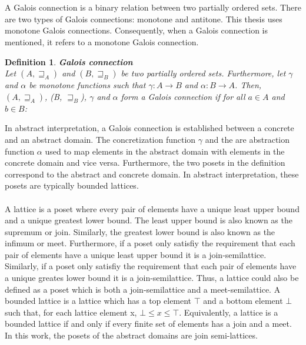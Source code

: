 \documentclass{kththesis}
\newtheorem*{definition}{Definition}
\begin{document}
\\ \\
A Galois connection is a binary relation between two partially ordered sets. There are two types of Galois connections: monotone and antitone. This thesis uses monotone Galois connections. Consequently, when a Galois connection is mentioned, it refers to a monotone Galois connection.
\begin{definition} \textbf{Galois connection}\\
Let $(A, \sqsupseteq_A)$ and $(B, \sqsupseteq_B)$ be two partially ordered sets. Furthermore, let $\gamma$ and $\alpha$ be monotone functions such that  $\gamma : A \rightarrow B$ and $\alpha : B \rightarrow A$. Then, ${(A, \sqsupseteq_A)}$, (B, $\sqsupseteq_B$), $\gamma$ and $\alpha$ form a Galois connection if for all $a \in A$ and $b \in B$:
\end{definition}
\noindent
In abstract interpretation, a Galois connection is established between a concrete and an abstract domain. The concretization function $\gamma$ and the are abstraction function $\alpha$ used to map elements in the abstract domain with elements in the concrete domain and vice versa. Furthermore, the two posets in the definition correspond to the abstract and concrete domain. In abstract interpretation, these posets are typically bounded lattices.
\\ \\%
A lattice is a poset where every pair of elements have a unique least upper bound and a unique greatest lower bound. The least upper bound is also known as the supremum or join. Similarly, the greatest lower bound is also known as the infimum or meet. Furthermore, if a poset only satisfiy the requirement that each pair of elements have a unique least upper bound it is a join-semilattice. Similarly, if a poset only satisfiy the requirement that each pair of elements have a unique greates lower bound it is a join-semilattice. Thus, a lattice could also be defined as a poset which is both a join-semilattice and a meet-semilattice. A bounded lattice is a lattice which has a top element $\top$ and a bottom element $\bot$ such that, for each lattice element x, $\bot \leq x \leq \top$. Equivalently, a lattice is a bounded lattice if and only if every finite set of elements has a join and a meet. In this work, the posets of the abstract domains are join semi-lattices. 
\\ \\
\end{document}
